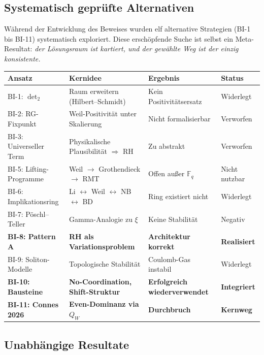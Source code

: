 \documentclass[12pt,a4paper]{article}
\theoremstyle{definition}
\theoremstyle{remark}
\begin{document}

\subsection{Systematisch geprüfte Alternativen}

Während der Entwicklung des Beweises wurden elf alternative Strategien (BI-1 bis BI-11) systematisch exploriert. Diese erschöpfende Suche ist selbst ein Meta-Resultat: \emph{der Lösungsraum ist kartiert, und der gewählte Weg ist der einzig konsistente.}

\begin{center}
\small
\renewcommand{\arraystretch}{1.2}
\begin{tabular}{l|p{4.5cm}|l|l}
\textbf{Ansatz} & \textbf{Kernidee} & \textbf{Ergebnis} & \textbf{Status} \\\hline
BI-1: $\det_2$ & Raum erweitern (Hilbert--Schmidt) & Kein Positivitätsersatz & Widerlegt \\
BI-2: RG-Fixpunkt & Weil-Positivität unter Skalierung & Nicht formalisierbar & Verworfen \\
BI-3: Universeller Term & Physikalische Plausibilität $\Rightarrow$ RH & Zu abstrakt & Verworfen \\
BI-5: Lifting-Programme & Weil $\to$ Grothendieck $\to$ RMT & Offen außer $\mathbb{F}_q$ & Nicht nutzbar \\
BI-6: Implikationsring & Li $\leftrightarrow$ Weil $\leftrightarrow$ NB $\leftrightarrow$ BD & Ring existiert nicht & Widerlegt \\
BI-7: Pöschl--Teller & Gamma-Analogie zu $\xi$ & Keine Stabilität & Negativ \\
\textbf{BI-8: Pattern A} & \textbf{RH als Variationsproblem} & \textbf{Architektur korrekt} & \textbf{Realisiert} \\
BI-9: Soliton-Modelle & Topologische Stabilität & Coulomb-Gas instabil & Widerlegt \\
\textbf{BI-10: Bausteine} & \textbf{No-Coordination, Shift-Struktur} & \textbf{Erfolgreich wiederverwendet} & \textbf{Integriert} \\
\textbf{BI-11: Connes 2026} & \textbf{Even-Dominanz via $Q_W$} & \textbf{Durchbruch} & \textbf{Kernweg}
\end{tabular}
\end{center}


\subsection{Unabhängige Resultate}
\end{document}
